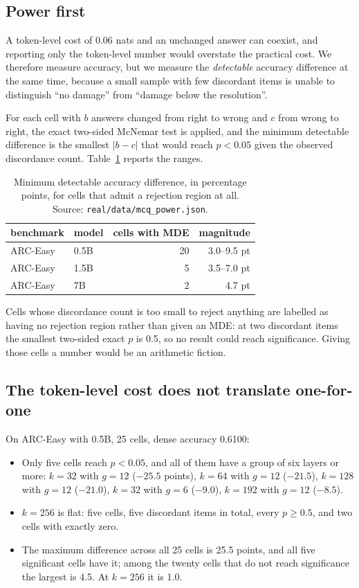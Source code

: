 \documentclass[10pt]{article}
\begin{document}
\subsection{Power first}

A token-level cost of 0.06 nats and an unchanged answer can coexist, and
reporting only the token-level number would overstate the practical cost.
We therefore measure accuracy, but we measure the \emph{detectable} accuracy
difference at the same time, because a small sample with few discordant
items is unable to distinguish ``no damage'' from ``damage below the resolution''.

For each cell with $b$ answers changed from right to wrong and $c$ from wrong
to right, the exact two-sided McNemar test is applied, and the minimum
detectable difference is the smallest $|b-c|$ that would reach $p<0.05$ given
the observed discordance count. Table~\ref{tab:mde} reports the ranges.

\begin{table}[h]
\centering
\caption{Minimum detectable accuracy difference, in percentage points, for
cells that admit a rejection region at all. Source:
\texttt{real/data/mcq\_power.json}.}
\label{tab:mde}
\begin{tabular}{llrr}
\toprule
benchmark & model & cells with MDE & magnitude \\
\midrule
ARC-Easy & 0.5B & 20 & 3.0--9.5 pt \\
ARC-Easy & 1.5B & 5 & 3.5--7.0 pt \\
ARC-Easy & 7B & 2 & 4.7 pt \\
\bottomrule
\end{tabular}
\end{table}

Cells whose discordance count is too small to reject anything are labelled
as having no rejection region rather than given an MDE: at two discordant
items the smallest two-sided exact $p$ is 0.5, so no result could reach
significance. Giving those cells a number would be an arithmetic fiction.

\subsection{The token-level cost does not translate one-for-one}

On ARC-Easy with 0.5B, 25 cells, dense accuracy 0.6100:

\begin{itemize}
\item Only five cells reach $p<0.05$, and all of them have a group of six
      layers or more: $k{=}32$ with $g{=}12$ ($-25.5$ points), $k{=}64$ with
      $g{=}12$ ($-21.5$), $k{=}128$ with $g{=}12$ ($-21.0$), $k{=}32$ with
      $g{=}6$ ($-9.0$), $k{=}192$ with $g{=}12$ ($-8.5$).
\item $k{=}256$ is flat: five cells, five discordant items in total, every
      $p \ge 0.5$, and two cells with exactly zero.
\item The maximum difference across all 25 cells is 25.5 points, and all
      five significant cells have it; among the twenty cells that do not
      reach significance the largest is 4.5. At $k{=}256$ it is 1.0.
\end{itemize}
\end{document}
